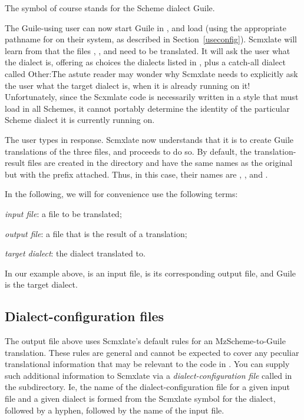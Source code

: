 
\n The symbol  of course stands for the Scheme
dialect Guile.

The Guile-using user can now start Guile in ,
and load  (using the appropriate
pathname for  on their system, as
described in Section~\ref{useconfig}).  Scmxlate will learn
from  that the files
, , and  need to be
translated.  It will ask the user what the dialect is,
offering as choices the dialects listed in
, plus a catch-all
dialect called Other:\f{The astute reader may wonder
why Scmxlate needs to explicitly ask the user what the
target dialect is, when it is already running on it!
Unfortunately, since the Scxmlate code is necessarily
written in a style that must load in all Schemes, it
cannot portably determine the identity of the
particular Scheme dialect it is currently running on.}


The user types  in response.  Scmxlate now
understands that it is to create Guile translations of
the three files, and proceeds to do so.  By default,
the translation-result files are created in the
 directory and have the same names as the
original but with the prefix  attached.  Thus,
in this case, their names are ,
, and .

In the following, we will for convenience use
the following terms:

\item{\bull} {\em input file}: a file to be translated;
\item{\bull} {\em output file}: a file that is the result of
a translation;
\item{\bull} {\em target dialect}: the dialect translated to.

\n In our example above,  is an input
file,  is its corresponding output file,
and Guile is the target dialect.

\subsection{Dialect-configuration files}

The output  file  above uses Scmxlate's
default rules for an MzScheme-to-Guile translation.
These rules are general and cannot be expected to cover
any peculiar translational information that may be
relevant to the code in .  You can supply such
additional information to Scmxlate via a {\em
dialect-configuration file} called  in
the  subdirectory.   Ie, the name of
the dialect-configuration file for a given input file
and a given dialect is formed from  the Scmxlate symbol
for the dialect, followed by a hyphen, followed by the
name of the input file.

